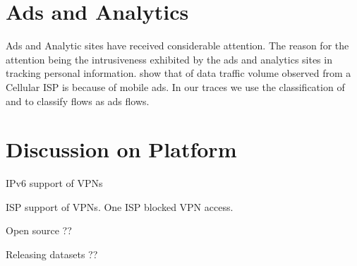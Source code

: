 \section{Ads and Analytics}

Ads and Analytic sites have received considerable attention.
The reason for the attention being the intrusiveness exhibited by the ads and analytics sites in tracking personal information. 
\cite{vallina-rod:ads} show that \tbdv{ } of data traffic volume observed from a Cellular ISP is because of mobile ads. 
In our traces we use the classification of \cite{vallina-rod:ads} and \cite{YoyoAds} to classify flows as ads flows. 



\section{Discussion on Platform}

IPv6 support of VPNs

ISP support of VPNs. One ISP blocked VPN access. 

Open source ??

Releasing datasets ??


